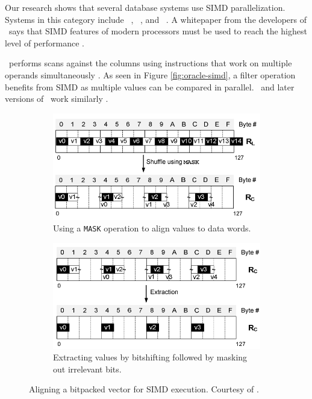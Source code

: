 Our research shows that several database systems use SIMD parallelization. Systems in this category include \oracle~\cite{Lahiri2015-mz}, \blink~\cite{Barber2012-xt}, and \ibm~\cite{Raman2013-em}. A whitepaper from the developers of \exasol~says that SIMD features of modern processors must be used to reach the highest level of performance \cite{Exasol2014-xh}.

\oracle~performs scans against the columns using instructions that work on multiple operands simultaneously \cite{Lahiri2015-mz}. As seen in Figure \ref{fig:oracle-simd}, a filter operation benefits from SIMD as multiple values can be compared in parallel. \ibm~and later versions of \blink~work similarly \cite{Barber2012-xt, Raman2013-em}.

\begin{figure}
  \centering
  \begin{subfigure}{0.45\textwidth}
    \includegraphics[width=\textwidth]{img/simd-align-1.png}
    \caption{Using a \texttt{MASK} operation to align values to data words.}
    \label{fig:simd-align-1} 
  \end{subfigure}
  \begin{subfigure}{0.45\textwidth}
    \includegraphics[width=\textwidth]{img/simd-align-2.png}
    \caption{Extracting values by bitshifting followed by masking out irrelevant bits.}
    \label{fig:simd-align-2} 
  \end{subfigure}
  \caption{Aligning a bitpacked vector for SIMD execution. Courtesy of \cite{Willhalm2009-hu}.}
  \label{fig:simd-align} 
\end{figure}

